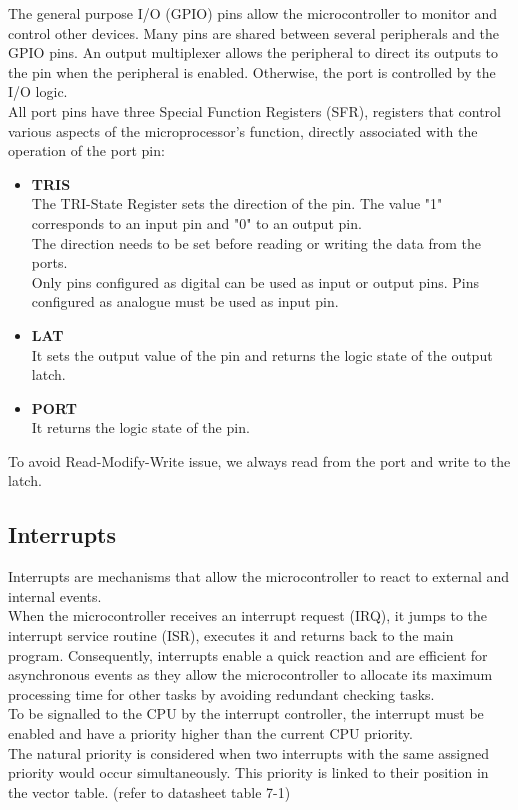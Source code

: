 The general purpose I/O (GPIO) pins allow the microcontroller to monitor and control other devices.
Many pins are shared between several peripherals and the GPIO pins.  An output multiplexer allows the peripheral to direct its outputs to the pin when the peripheral is enabled. Otherwise, the port is controlled by the I/O logic.\\
All port pins have three Special Function Registers (SFR), registers that control various aspects of the microprocessor's function, directly associated with the operation of the port pin:
\begin{itemize}
    \item \textbf{TRIS}\\
    The TRI-State Register sets the direction of the pin. The value "1" corresponds to an input pin and "0" to an output pin.\\
    The direction needs to be set before reading or writing the data from the ports. \\
    Only pins configured as digital can be used as input or output pins. Pins configured as analogue must be used as input pin.
    \item \textbf{LAT}\\
    It sets the output value of the pin and returns the logic state of the output latch.
    \item \textbf{PORT}\\
    It returns the logic state of the pin. 
\end{itemize}
To avoid Read-Modify-Write issue, we always read from the port and write to the latch.

\subsection{Interrupts}

Interrupts are mechanisms that allow the microcontroller to react to external and internal events.\\
When the microcontroller receives an interrupt request (IRQ), it jumps to the interrupt service routine (ISR), executes it and returns back to the main program. 
Consequently, interrupts enable a quick reaction and are efficient for asynchronous events as they allow the microcontroller to allocate its maximum processing time for other tasks by avoiding redundant checking tasks.\\

\noindent
To be signalled to the CPU by the interrupt controller, the interrupt must be enabled and have a priority higher than the current CPU priority.\\
The natural priority is considered when two interrupts with the same assigned priority would occur simultaneously. This priority is linked to their position in the vector table. (refer to datasheet table 7-1)

